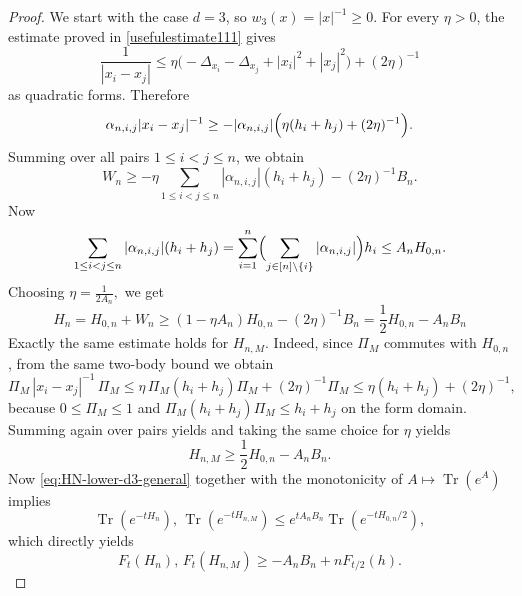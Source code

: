 \documentclass[11pt]{amsart}
\newcommand{\1}{\mathbbm{1}}
\newcommand{\Tr}{\operatorname{Tr}}
\theoremstyle{plain}
\theoremstyle{definition}
\theoremstyle{remark}
\numberwithin{equation}{section}
\begin{document}
\begin{proof}

We start with the case \(d=3\), so $w_3(x)=|x|^{-1}\ge0$. For every \(\eta>0\), the estimate proved in \eqref{usefulestimate111} gives
\[
\frac{1}{|x_i-x_j|}
\le
\eta\bigl(-\Delta_{x_i}-\Delta_{x_j}+|x_i|^2+|x_j|^2\bigr)+(2\eta)^{-1}
\]
as quadratic forms. Therefore
\[
\alpha_{n,i,j}|x_i-x_j|^{-1}
\ge
-|\alpha_{n,i,j}|\Bigl(\eta(h_i+h_j)+(2\eta)^{-1}\Bigr).
\]
Summing over all pairs \(1\le i<j\le n\), we obtain
\[
W_n
\ge
-\eta\sum_{1\le i<j\le n}|\alpha_{n,i,j}|(h_i+h_j)-(2\eta)^{-1} B_n.
\]
Now
\[
\sum_{1\le i<j\le n}|\alpha_{n,i,j}|(h_i+h_j)
=
\sum_{i=1}^n\Bigl(\sum_{j\in[n]\setminus\{i\}}|\alpha_{n,i,j}|\Bigr)h_i
\le
A_n H_{0,n}.
\]
Choosing \(\eta = \frac{1}{2A_n},\) we get
\begin{equation}
\label{eq:HN-lower-d3-general}
H_n=H_{0,n}+W_n \ge (1- \eta A_n)H_{0,n} - (2\eta)^{-1}B_n = \frac{1}{2}H_{0,n} - A_nB_n
\end{equation}
Exactly the same estimate holds for \(H_{n,M}\). Indeed, since \(\Pi_M\) commutes with \(H_{0,n}\), from the same two-body bound we obtain
\[
\Pi_M\,|x_i-x_j|^{-1}\,\Pi_M
\le
\eta\,\Pi_M(h_i+h_j)\Pi_M+(2\eta)^{-1}\Pi_M
\le
\eta(h_i+h_j)+(2\eta)^{-1},
\]
because \(0\le \Pi_M\le 1\) and \(\Pi_M(h_i+h_j)\Pi_M\le h_i+h_j\) on the form domain. Summing again over pairs yields and taking the same choice for $\eta$ yields 
\begin{equation}
\label{eq:HNM-lower-d3-general}
H_{n,M}\ge \frac{1}{2}H_{0,n}- A_n B_n.
\end{equation}
Now \eqref{eq:HN-lower-d3-general} together with the monotonicity of $A\mapsto \Tr(e^A)$ implies
\[
\Tr(e^{-tH_n}),\,\Tr(e^{-tH_{n,M}})\le e^{t A_n B_n}\Tr(e^{-t H_{0,n}/2}),
\]
which directly yields
\[
F_t(H_n),\,F_t(H_{n,M})\ge - A_n B_n+ nF_{t/2}(h).
\]


\end{proof}
\end{document}
